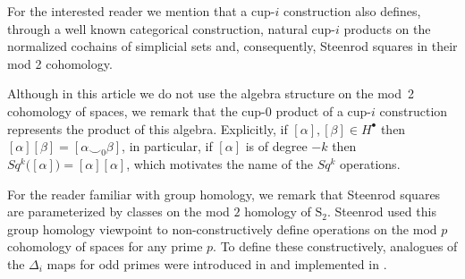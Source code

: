 \begin{remark}
	For the interested reader we mention that a cup-$i$ construction also defines, through a well known categorical construction, natural cup-$i$ products on the normalized cochains of simplicial sets \cite{friedman2012simplicial} and, consequently, Steenrod squares in their mod 2 cohomology.
\end{remark}

\begin{remark}
	Although in this article we do not use the algebra structure on the mod~2 cohomology of spaces, we remark that the cup-$0$ product of a cup-$i$ construction represents the product of this algebra.
	Explicitly, if $[\alpha], [\beta] \in H^\bullet$ then $[\alpha][\beta] = [\alpha \smallsmile_0 \beta]$, in particular, if $[\alpha]$ is of degree $-k$ then $Sq^k\big([\alpha]\big) = [\alpha] [\alpha]$, which motivates the name of the $Sq^k$ operations.
\end{remark}

\begin{remark}
	For the reader familiar with group homology, we remark that Steenrod squares are parameterized by classes on the mod $2$ homology of $\mathrm S_2$.
	Steenrod used this group homology viewpoint to non-constructively define operations on the mod $p$ cohomology of spaces \cite{steenrod1962cohomology} for any prime $p$.
	To define these constructively, analogues of the $\Delta_i$ maps for odd primes were introduced in \cite{medina2020maysteenrod} and implemented in \cite{medina2021computer}.
\end{remark}
